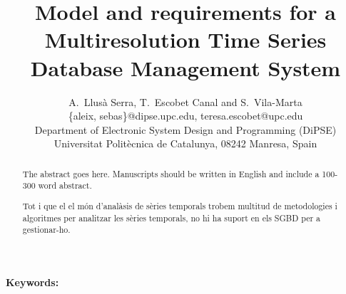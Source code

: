 \documentclass{scrartcl}
\title{
  Model and requirements for a Multiresolution Time Series
  Database Management System }
\author
{
  {
    A.\ Llusà Serra,
    T.\ Escobet Canal
    and S.\ Vila-Marta
  }\\
  {\{aleix, sebas\}@dipse.upc.edu, teresa.escobet@upc.edu}\\
  {Department of Electronic System Design and Programming (DiPSE)}\\
  {Universitat Politècnica de Catalunya, 08242 Manresa, Spain}
}
\begin{document}
\maketitle


\begin{abstract}
The abstract goes here.
Manuscripts should be written in English and include a 100-300 word abstract.

Tot i que el el món d'analàsis de sèries temporals trobem multitud de metodologies i algoritmes per analitzar les sèries temporals, no hi ha suport en els SGBD per a gestionar-ho.
\end{abstract}

{\bfseries Keywords:} 















\printbibliography{}
\end{document}
